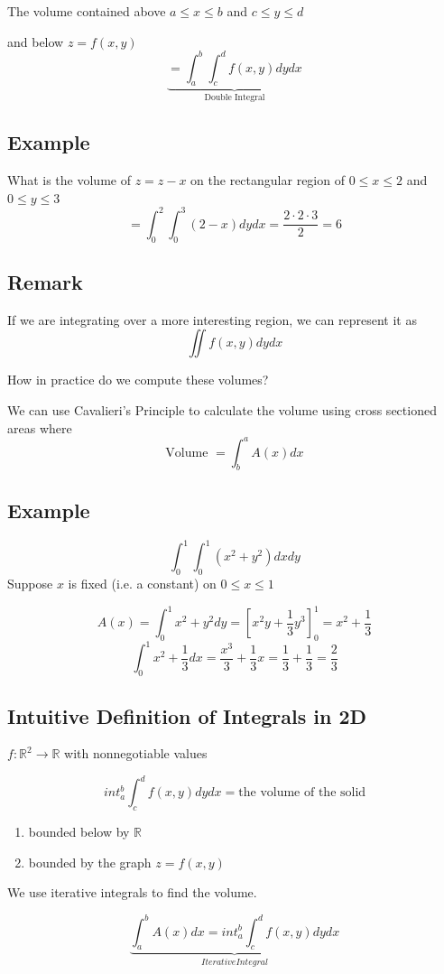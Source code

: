 \documentclass{article}
\begin{document}
The volume contained above $a\leq x \leq b$ and $c\leq y \leq d$

and below $z=f(x,y)$
\[\underbrace{=\int^{b}_{a}\int^{d}_{c} f(x,y)dy dx}_{\mbox{Double Integral}}\]

\subsection*{Example}
What is the volume of $z=z-x$ on the rectangular region of $0\leq x \leq 2$ and $0 \leq y \leq 3$
\[=\int^{2}_{0}\int^{3}_{0} (2-x)dy dx =\frac{2\cdot 2\cdot 3}{2}=6\]

\subsection*{Remark}
If we are integrating over a more interesting region, we can represent it as
\[\iint f(x,y)dydx\]

How in practice do we compute these volumes?

We can use Cavalieri's Principle to calculate the volume using cross sectioned areas where
\[\mbox{Volume }= \int^{a}_{b} A(x)dx\]

\subsection*{Example}
\[\int^1_0\int^1_0 (x^2+y^2)dxdy\]
Suppose $x$ is fixed (i.e. a constant) on $0\leq x \leq 1$

\[A(x)=\int^1_0 x^2+y^2 dy=\left[x^2 y+\frac{1}{3}y^3\right]^1_0 =x^2+\frac{1}{3}\]
\[\int^1_0 x^2+\frac{1}{3}dx = \frac{x^3}{3}+\frac{1}{3}x=\frac{1}{3}+\frac{1}{3}=\frac{2}{3}\]

\subsection*{Intuitive Definition of Integrals in 2D}
$f:\mathbb{R}^2\rightarrow\mathbb{R}$ with nonnegotiable values

\[int^{b}_{a}\int^{d}_{c} f(x,y)dydx = \mbox{the volume of the solid}\]
\begin{enumerate}
    \item bounded below by $\mathbb{R}$
    \item bounded by the graph $z=f(x,y)$
\end{enumerate}
We use iterative integrals to find the volume.

\[\underbrace{\int^b_a A(x)dx=int^{b}_{a}\int^{d}_{c} f(x,y) dy dx}_{Iterative Integral}\]
\end{document}
